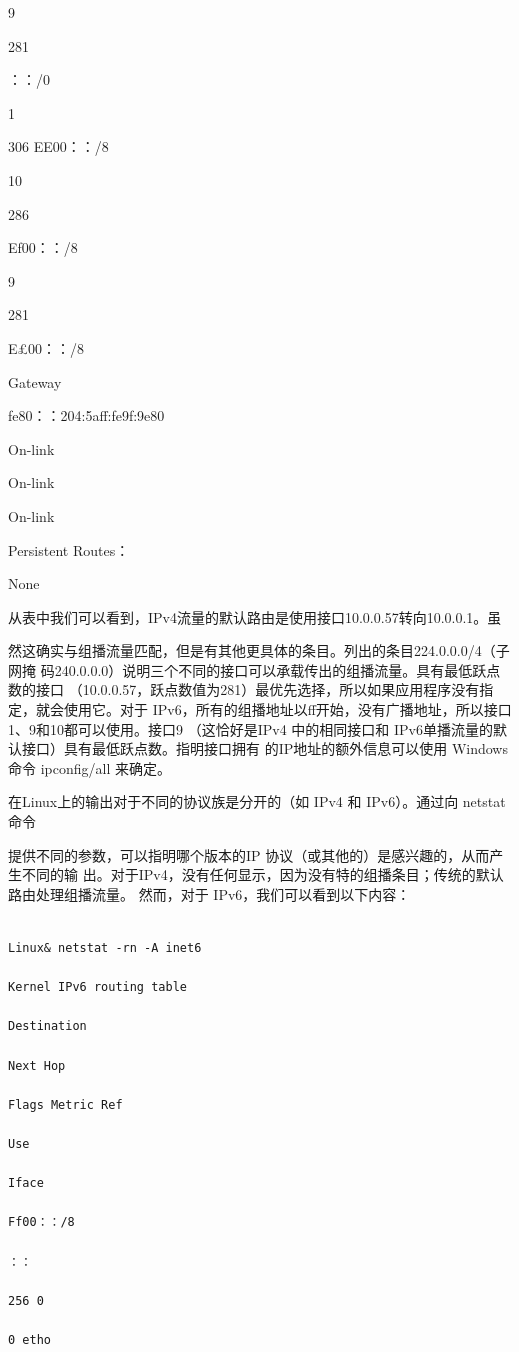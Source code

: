 9

281

：：/0

1

306 EE00：：/8

10

286

Ef00：：/8

9

281

E£00：：/8

Gateway

fe80：：204:5aff:fe9f:9e80

On-link

On-link

On-link

Persistent Routes：

None

从表中我们可以看到，IPv4流量的默认路由是使用接口10.0.0.57转向10.0.0.1。虽

然这确实与组播流量匹配，但是有其他更具体的条目。列出的条目224.0.0.0/4（子网掩
码240.0.0.0）说明三个不同的接口可以承载传出的组播流量。具有最低跃点数的接口
（10.0.0.57，跃点数值为281）最优先选择，所以如果应用程序没有指定，就会使用它。对于
IPv6，所有的组播地址以ff开始，没有广播地址，所以接口1、9和10都可以使用。接口9
（这恰好是IPv4 中的相同接口和 IPv6单播流量的默认接口）具有最低跃点数。指明接口拥有
的IP地址的额外信息可以使用 Windows 命令 ipconfig/all 来确定。

在Linux上的输出对于不同的协议族是分开的（如 IPv4 和 IPv6）。通过向 netstat 命令

提供不同的参数，可以指明哪个版本的IP 协议（或其他的）是感兴趣的，从而产生不同的输
出。对于IPv4，没有任何显示，因为没有特的组播条目；传统的默认路由处理组播流量。
然而，对于 IPv6，我们可以看到以下内容：

\begin{verbatim}
    
Linux& netstat -rn -A inet6

Kernel IPv6 routing table

Destination

Next Hop

Flags Metric Ref

Use

Iface

Ff00：：/8

：：

256 0

0 etho
\end{verbatim}

